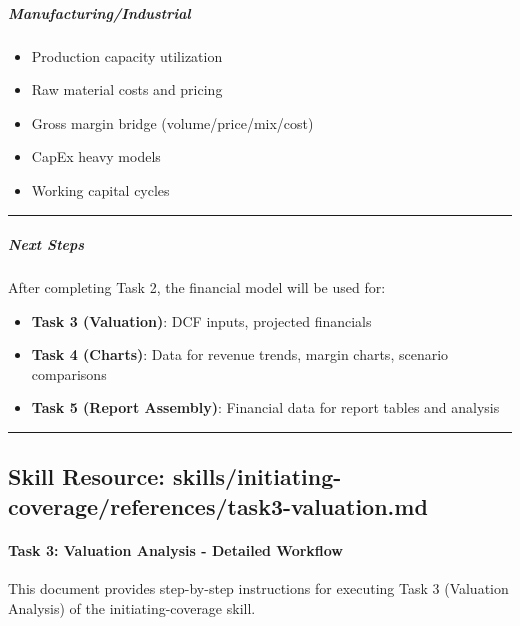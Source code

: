 \documentclass[11pt]{article}
\begin{document}
\subparagraph{Manufacturing/Industrial}\mbox{}\par
\begin{itemize}[leftmargin=*,itemsep=2pt,topsep=2pt]
\item {} Production capacity utilization
\item {} Raw material costs and pricing
\item {} Gross margin bridge (volume/price/mix/cost)
\item {} CapEx heavy models
\item {} Working capital cycles
\end{itemize}

\vspace{0.5em}\hrule\vspace{0.5em}

\subparagraph{Next Steps}\mbox{}\par

After completing Task 2, the financial model will be used for:

\begin{itemize}[leftmargin=*,itemsep=2pt,topsep=2pt]
\item {} \textbf{Task 3 (Valuation)}: DCF inputs, projected financials
\item {} \textbf{Task 4 (Charts)}: Data for revenue trends, margin charts, scenario comparisons
\item {} \textbf{Task 5 (Report Assembly)}: Financial data for report tables and analysis
\end{itemize}

\vspace{0.8em}\hrule\vspace{0.8em}

\subsection{Skill Resource: skills/initiating-coverage/references/task3-valuation.md}\label{file:skills-initiating-coverage-references-task3-valuation-md}

\paragraph{Task 3: Valuation Analysis - Detailed Workflow}\mbox{}\par

This document provides step-by-step instructions for executing Task 3 (Valuation Analysis) of the initiating-coverage skill.
\end{document}
